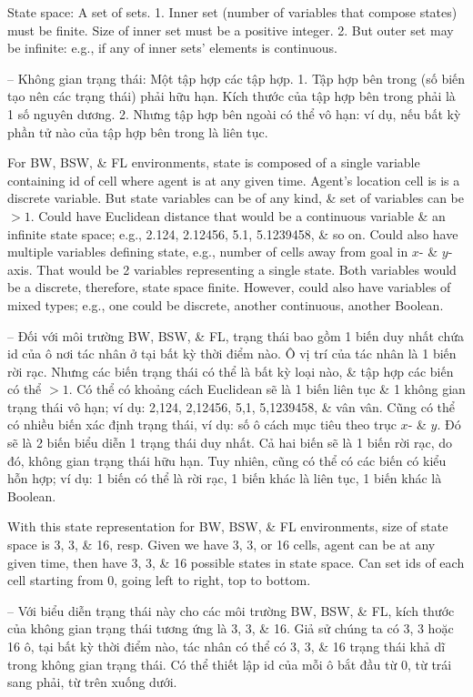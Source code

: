 \documentclass{article}
\begin{document}
\begin{itemize}
\begin{itemize}
        {\sf State space: A set of sets.} 1. Inner set (number of variables that compose states) must be finite. Size of inner set must be a positive integer. 2. But outer set may be infinite: e.g., if any of inner sets' elements is continuous.

        -- {\sf Không gian trạng thái: Một tập hợp các tập hợp.} 1. Tập hợp bên trong (số biến tạo nên các trạng thái) phải hữu hạn. Kích thước của tập hợp bên trong phải là 1 số nguyên dương. 2. Nhưng tập hợp bên ngoài có thể vô hạn: ví dụ, nếu bất kỳ phần tử nào của tập hợp bên trong là liên tục.

        For BW, BSW, \& FL environments, state is composed of a single variable containing id of cell where agent is at any given time. Agent's location cell is is a discrete variable. But state variables can be of any kind, \& set of variables can be $> 1$. Could have Euclidean distance that would be a continuous variable \& an infinite state space; e.g., 2.124, 2.12456, 5.1, 5.1239458, \& so on. Could also have multiple variables defining state, e.g., number of cells away from goal in $x$- \& $y$-axis. That would be 2 variables representing a single state. Both variables would be a discrete, therefore, state space finite. However, could also have variables of mixed types; e.g., one could be discrete, another continuous, another Boolean.

        -- Đối với môi trường BW, BSW, \& FL, trạng thái bao gồm 1 biến duy nhất chứa id của ô nơi tác nhân ở tại bất kỳ thời điểm nào. Ô vị trí của tác nhân là 1 biến rời rạc. Nhưng các biến trạng thái có thể là bất kỳ loại nào, \& tập hợp các biến có thể $> 1$. Có thể có khoảng cách Euclidean sẽ là 1 biến liên tục \& 1 không gian trạng thái vô hạn; ví dụ: 2,124, 2,12456, 5,1, 5,1239458, \& vân vân. Cũng có thể có nhiều biến xác định trạng thái, ví dụ: số ô cách mục tiêu theo trục $x$- \& $y$. Đó sẽ là 2 biến biểu diễn 1 trạng thái duy nhất. Cả hai biến sẽ là 1 biến rời rạc, do đó, không gian trạng thái hữu hạn. Tuy nhiên, cũng có thể có các biến có kiểu hỗn hợp; ví dụ: 1 biến có thể là rời rạc, 1 biến khác là liên tục, 1 biến khác là Boolean.

        With this state representation for BW, BSW, \& FL environments, size of state space is 3, 3, \& 16, resp. Given we have 3, 3, or 16 cells, agent can be at any given time, then have 3, 3, \& 16 possible states in state space. Can set ids of each cell starting from 0, going left to right, top to bottom.

        -- Với biểu diễn trạng thái này cho các môi trường BW, BSW, \& FL, kích thước của không gian trạng thái tương ứng là 3, 3, \& 16. Giả sử chúng ta có 3, 3 hoặc 16 ô, tại bất kỳ thời điểm nào, tác nhân có thể có 3, 3, \& 16 trạng thái khả dĩ trong không gian trạng thái. Có thể thiết lập id của mỗi ô bắt đầu từ 0, từ trái sang phải, từ trên xuống dưới.


\end{itemize}
\end{itemize}
\end{document}

